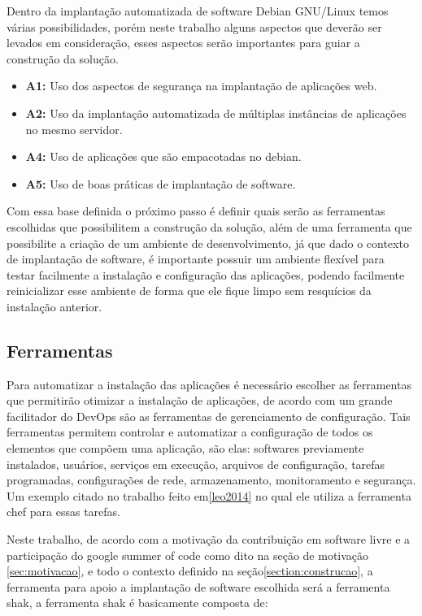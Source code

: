 Dentro da implantação automatizada de software Debian GNU/Linux temos várias
possibilidades, porém neste trabalho alguns aspectos que deverão ser levados em
consideração, esses aspectos serão importantes para guiar a construção da solução.

\begin{itemize}
  \item  \textbf{A1:} Uso dos aspectos de segurança na implantação de aplicações web.
  \item  \textbf{A2:} Uso da implantação automatizada de múltiplas instâncias de
   aplicações no mesmo servidor.
  \item  \textbf{A4:} Uso de aplicações que são empacotadas no debian.
  \item  \textbf{A5:} Uso de boas práticas de implantação de software.
\end{itemize}

Com essa base definida o próximo passo é definir quais serão as ferramentas
escolhidas que possibilitem a construção da solução, além de uma ferramenta
que possibilite a criação de um ambiente de desenvolvimento, já que dado o
contexto de implantação de software, é importante possuir um ambiente flexível
para testar facilmente a instalação e configuração das aplicações,
podendo facilmente reinicializar esse ambiente de forma que ele fique limpo sem
resquícios da instalação anterior.

\subsection{Ferramentas}

Para automatizar a instalação das aplicações é necessário escolher as ferramentas
que permitirão otimizar a instalação de aplicações, de acordo com\cite{6265084}
um grande facilitador do DevOps são as ferramentas de gerenciamento de configuração.
Tais ferramentas permitem controlar e automatizar a configuração de todos os
elementos que compõem uma aplicação, são elas: softwares previamente instalados,
usuários, serviços em execução, arquivos de configuração, tarefas programadas,
configurações de rede, armazenamento, monitoramento e segurança. Um exemplo citado
no trabalho feito em\ref{leo2014} no qual ele utiliza a ferramenta chef para
essas tarefas.

Neste trabalho, de acordo com a motivação da contribuição em software livre
e a participação do google summer of code como dito na seção de motivação
\ref{sec:motivacao}, e todo o contexto definido na seção\ref{section:construcao},
a ferramenta para apoio a implantação de software escolhida
será a ferramenta shak, a ferramenta shak é basicamente composta de:

